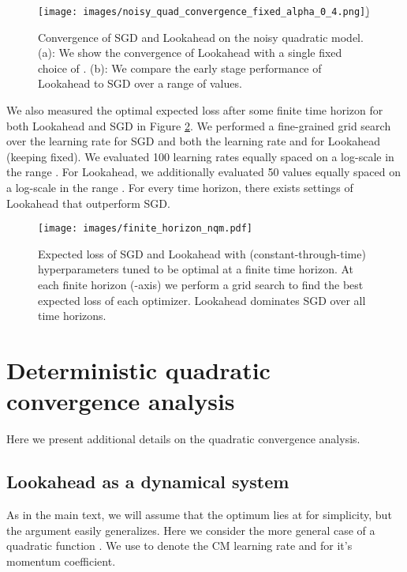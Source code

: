 \documentclass{article}
\begin{document}
\begin{figure}
    \begin{minipage}{.5\textwidth}
    \centering
    \texttt{[image: images/noisy\_quad\_convergence\_fixed\_alpha\_0\_4.png]}\b)
    \end{minipage}
    \caption{Convergence of SGD and Lookahead on the noisy quadratic model. (a): We show the convergence of Lookahead with a single fixed choice of . (b): We compare the early stage performance of Lookahead to SGD over a range of  values. }
    \label{fig:noisy_quad_more_convergence}
\end{figure}

We also measured the optimal expected loss after some finite time horizon for both Lookahead and SGD in Figure \ref{fig:finite_horizon_nqm}. We performed a fine-grained grid search over the learning rate for SGD and both the learning rate and  for Lookahead (keeping  fixed). We evaluated 100 learning rates equally spaced on a log-scale in the range . For Lookahead, we additionally evaluated 50  values equally spaced on a log-scale in the range . For every time horizon, there exists settings of Lookahead that outperform SGD.



\begin{figure}
    \centering
    \texttt{[image: images/finite\_horizon\_nqm.pdf]}
    \caption{Expected loss of SGD and Lookahead with (constant-through-time) hyperparameters tuned to be optimal at a finite time horizon. At each finite horizon (-axis) we perform a grid search to find the best expected loss of each optimizer. Lookahead dominates SGD over all time horizons.}
    \label{fig:finite_horizon_nqm}
\end{figure}
 \section{Deterministic quadratic convergence analysis}
\label{app:quadratic}

Here we present additional details on the quadratic convergence analysis.

\subsection{Lookahead as a dynamical system}

As in the main text, we will assume that the optimum lies at  for simplicity, but the argument easily generalizes. Here we consider the more general case of a quadratic function . We use  to denote the CM learning rate and  for it's momentum coefficient.
\end{document}
